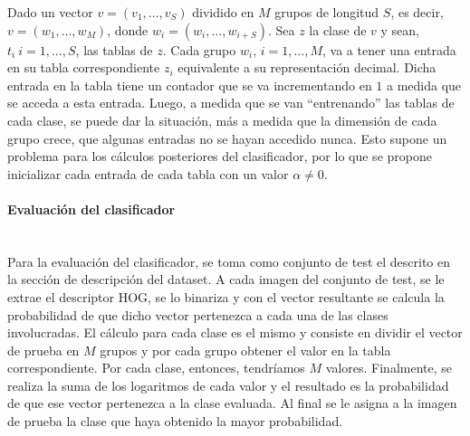 			Dado un vector $v=(v_1, \dots, v_S)$ dividido en $M$ grupos de longitud $S$, es decir, $v=(w_1,\dots,w_M)$, donde $w_i=(w_i,\dots,w_{i+S})$. Sea $z$ la clase de $v$ y sean, $t_i~ i=1, \dots, S$, las tablas de $z$. Cada grupo $w_i$, $i=1, \dots, M$, va a tener una entrada en su tabla correspondiente $z_i$ equivalente a su representación decimal. Dicha entrada en la tabla tiene un contador que se va incrementando en $1$ a medida que se acceda a esta entrada. Luego, a medida que se van ``entrenando'' las tablas de cada clase, se puede dar la situación, más a medida que la dimensión de cada grupo crece, que algunas entradas no se hayan accedido nunca. Esto supone un problema para los cálculos posteriores del clasificador, por lo que se propone inicializar cada entrada de cada tabla con un valor $\alpha \neq 0$. 

		\paragraph{Evaluación del clasificador} ~\\

			Para la evaluación del clasificador, se toma como conjunto de test el descrito en la sección de descripción del dataset. A cada imagen del conjunto de test, se le extrae el descriptor HOG, se lo binariza y con el vector resultante se calcula la probabilidad de que dicho vector pertenezca a cada una de las clases involucradas. El cálculo para cada clase es el mismo y consiste en dividir el vector de prueba en $M$ grupos y por cada grupo obtener el valor en la tabla correspondiente. Por cada clase, entonces, tendríamos $M$ valores. Finalmente, se realiza la suma de los logaritmos de cada valor y el resultado es la probabilidad de que ese vector pertenezca a la clase evaluada. Al final se le asigna a la imagen de prueba la clase que haya obtenido la mayor probabilidad.

